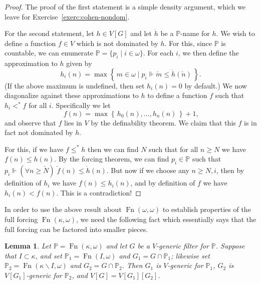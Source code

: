 \documentclass[11pt,oneside,a4paper]{amsbook}
\newcommand{\set}[1]{\left\{\,#1\,\right\}}
\newcommand{\PP}{\mathbb P}
\newcommand{\forces}{\Vdash}
\DeclareMathOperator{\Fn}{Fn}
\theoremstyle{definition}
\theoremstyle{plain}
\newtheorem{lemma}[theorem]{Lemma}
\theoremstyle{definition}
\theoremstyle{remark}
\numberwithin{equation}{section}
\numberwithin{figure}{section}
\begin{document}
\begin{proof}
  The proof of the first statement is a simple density argument, which we leave for Exercise~\ref{exerc:cohen-nondom}.

  For the second statement, let $h\in V[G]$ and let $\dot h$ be a $\PP$-name for $h$. We wish to define a function $f\in V$ which is not dominated by $h$. For this, since $\PP$ is countable, we can enumerate $\PP=\{p_i\mid i\in\omega\}$. For each $i$, we then define the approximation to $h$ given by
  \[h_i(n)=\max\set{m\in\omega\mid p_i\forces\check m\leq\dot h(\check n)}\text{.}
  \]
  (If the above maximum is undefined, then set $h_i(n)=0$ by default.) We now diagonalize against these approximations to $h$ to define a function $f$ such that $h_i<^*f$ for all $i$. Specifically we let
  \[f(n)=\max\set{h_0(n),\ldots,h_n(n)}+1\text{,}
  \]
  and observe that $f$ lies in $V$ by the definability theorem. We claim that this $f$ is in fact not dominated by $h$.

  For this, if we have $f\leq^*h$ then we can find $N$ such that for all $n\geq N$ we have $f(n)\leq h(n)$. By the forcing theorem, we can find $p_i\in\PP$ such that $p_i\forces(\forall n\geq\check N)\;\check f(n)\leq\dot h(n)$. But now if we choose any $n\geq N,i$, then by definition of $h_i$ we have $f(n)\leq h_i(n)$, and by definition of $f$ we have $h_i(n)<f(n)$. This is a contradiction!
\end{proof}

In order to use the above result about $\Fn(\omega,\omega)$ to establish properties of the full forcing $\Fn(\kappa,\omega)$, we need the following fact which essentially says that the full forcing can be factored into smaller pieces.

\begin{lemma}
  \label{lem:product}
  Let $\PP=\Fn(\kappa,\omega)$ and let $G$ be a $V$-generic filter for $\PP$. Suppose that $I\subset\kappa$, and set $\PP_1=\Fn(I,\omega)$ and $G_1=G\cap\PP_1$; likewise set $\PP_2=\Fn(\kappa\smallsetminus I,\omega)$ and $G_2=G\cap\PP_2$. Then $G_1$ is $V$-generic for $\PP_1$, $G_2$ is $V[G_1]$-generic for $\PP_2$, and $V[G]=V[G_1][G_2]$.
\end{lemma}
\end{document}
